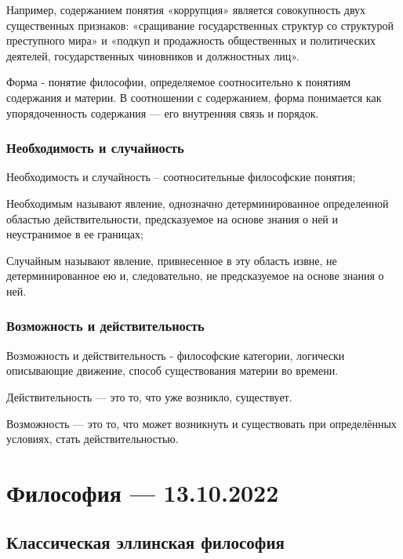 \documentclass{article}
\begin{document}
Например, содержанием понятия «коррупция» является совокупность двух существенных признаков: «сращивание государственных структур со структурой преступного мира» и «подкуп и продажность общественных и политических деятелей, государственных чиновников и должностных лиц».

Форма - понятие философии, определяемое соотносительно к понятиям содержания и материи. В соотношении с содержанием, форма понимается как упорядоченность содержания — его внутренняя связь и порядок.

\subsubsection{Необходимость и случайность}

Необходимость и случайность – соотносительные философские понятия;

Необходимым называют явление, однозначно детерминированное определенной областью действительности, предсказуемое на основе знания о ней и неустранимое в ее границах;

Случайным называют явление, привнесенное в эту область извне, не детерминированное ею и, следовательно, не предсказуемое на основе знания о ней.

\subsubsection{Возможность и действительность}

Возможность и действительность - философские категории, логически описывающие движение, способ существования материи во времени.

Действительность — это то, что уже возникло, существует.

Возможность — это то, что может возникнуть и существовать при определённых условиях, стать действительностью.

\pagebreak
\section{Философия — 13.10.2022}

\subsection{Классическая эллинская философия}
\end{document}
